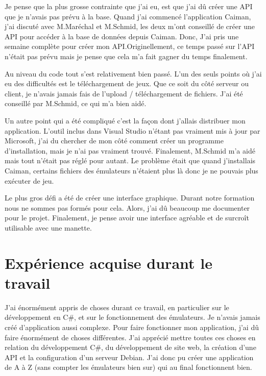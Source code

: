 \documentclass[a4paper,12pt,french]{sphinxmanual}
\begin{document}
\sphinxAtStartPar
Je pense que la plus grosse contrainte que j’ai eu, est que j’ai dû créer une API que je n’avais pas prévu à la base. Quand j’ai commencé l’application Caiman, j’ai discuté avec M.Maréchal et M.Schmid, les deux m’ont conseillé de créer une API pour accéder à la base de données depuis Caiman. Donc, J’ai pris une semaine complète pour créer mon API.Originellement, ce temps passé sur l’API n’était pas prévu mais je pense que cela m’a fait gagner du temps finalement.

\sphinxAtStartPar
Au niveau du code tout s’est relativement bien passé. L’un des seuls points où j’ai eu des difficultés est le téléchargement de jeux. Que ce soit du côté serveur ou client, je n’avais jamais fais de l’upload / téléchargement de fichiers. J’ai été conseillé par M.Schmid, ce qui m’a bien aidé.

\sphinxAtStartPar
Un autre point qui a été compliqué c’est la façon dont j’allais distribuer mon application. L’outil inclus dans Visual Studio n’étant pas vraiment mis à jour par Microsoft, j’ai du chercher de mon côté comment créer un programme d’installation, mais je n’ai pas vraiment trouvé. Finalement, M.Schmid m’a aidé mais tout n’était pas réglé pour autant. Le problème était que quand j’installais Caiman, certains fichiers des émulateurs n’étaient plus là donc je ne pouvais plus exécuter de jeu.

\sphinxAtStartPar
Le plus gros défi a été de créer une interface graphique. Durant notre formation nous ne sommes pas formés pour cela. Alors, j’ai dû beaucoup me documenter pour le projet. Finalement, je pense avoir une interface agréable et de surcroît utilisable avec une manette.


\section{Expérience acquise durant le travail}
\label{\detokenize{conclusion:experience-acquise-durant-le-travail}}
\sphinxAtStartPar
J’ai énormément appris de choses durant ce travail, en particulier sur le développement en C\#, et sur le fonctionnement des émulateurs. Je n’avais jamais créé d’application aussi complexe. Pour faire fonctionner mon application, j’ai dû faire énormément de choses différentes. J’ai apprécié mettre toutes ces choses en relation du développement C\#, du développement de site web, la création d’une API et la configuration d’un serveur Debian. J’ai donc pu créer une application de A à Z (sans compter les émulateurs bien sur) qui au final fonctionnent bien.
\end{document}
